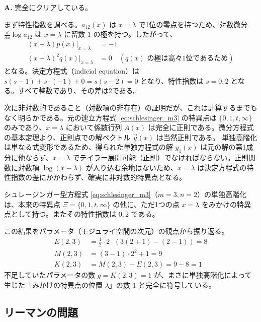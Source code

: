 \begin{Q}[【核心】新しく現れた特異点 $x=\lambda$ は、本当に「みかけの特異点」の厳しい条件（特性指数が整数差であり、かつ対数項を持たない）をクリアしているのか？]
\textbf{A.} 完全にクリアしている。

まず特性指数を調べる。$a_{12}(x)$ は $x=\lambda$ で1位の零点を持つため、対数微分 $\frac{d}{dx}\log a_{12}$ は $x=\lambda$ に留数 $1$ の極を持つ。したがって、
\begin{align*}
(x-\lambda)p(x)\big|_{x=\lambda} &= -1\\
(x-\lambda)^{2}q(x)\big|_{x=\lambda} &= 0 \quad (\text{$q(x)$ の極は高々1位であるため})
\end{align*}
となる。決定方程式（indicial equation）は $s(s-1) + s \cdot (-1) + 0 = s(s-2) = 0$ となり、特性指数は $s=0, 2$ となる。すべて整数であり、その差は2である。

次に非対数的であること（対数項の非存在）の証明だが、これは計算するまでもなく明らかである。元の連立方程式 \eqref{eq:schlesinger_m3} の特異点は $\{0, 1, t, \infty\}$ のみであり、$x=\lambda$ において係数行列 $A(x)$ は完全に正則である。微分方程式の基本定理より、正則点での解ベクトル $\vec{y}(x)$ は当然正則である。
単独高階化は単なる式変形であるため、得られた単独方程式の解 $y_1(x)$ は元の解の第1成分に他ならず、$x=\lambda$ でテイラー展開可能（正則）でなければならない。正則関数に対数項 $\log(x-\lambda)$ が入り込む余地はないため、$x=\lambda$ は決定方程式の特性指数の差にかかわらず、確実に非対数的特異点となる。
\end{Q}

\begin{proposition}
    シュレージンガー型方程式 \eqref{eq:schlesinger_m3}（$m=3, n=2$）の単独高階化は、本来の特異点 $\Xi=\{0,1,t,\infty\}$ の他に、ただ1つの点 $x=\lambda$ をみかけの特異点として持つ。またその特性指数は $0, 2$ である。
\end{proposition}

この結果をパラメータ（モジュライ空間の次元）の観点から振り返る。
\begin{align*}
E(2,3) &= \frac{1}{2} \cdot 2 \cdot (3(2+1)-(2-1)) = 8\\
M(2,3) &= (3-1) \cdot 2^{2} + 1 = 9\\
K(2,3) &= M(2,3) - E(2,3) = 9 - 8 = 1
\end{align*}
不足していたパラメータの数 $g = K(2,3) = 1$ が、まさに単独高階化によって生じた「みかけの特異点の位置 $\lambda$」の数 1 と完全に符号している。


\subsection{リーマンの問題}

